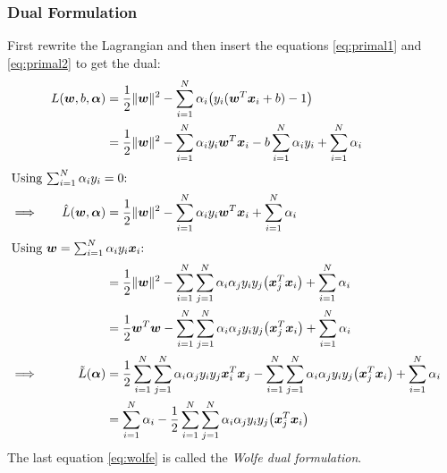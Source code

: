 			\subsubsection{Dual Formulation} %
				First rewrite the Lagrangian and then insert the equations \ref{eq:primal1} and \ref{eq:primal2} to get the dual:
				\begin{align}
					&& L(\vec{w}, b, \vec{\alpha}) &= \frac{1}{2} \lVert \vec{w} \rVert^2 - \sum_{i = 1}^{N} \alpha_i \big( y_i (\vec{w}^T \vec{x}_i + b) - 1 \big) & \\
					&& &= \frac{1}{2} \lVert \vec{w} \rVert^2 - \sum_{i = 1}^{N} \alpha_i y_i \vec{w}^T \vec{x}_i - b \sum_{i = 1}^{N} \alpha_i y_i + \sum_{i = 1}^{N} \alpha_i & \\
					\intertext{Using \( \sum_{i = 1}^{N} \alpha_i y_i = 0 \):}
					\implies && \hat{L}(\vec{w}, \vec{\alpha}) &= \frac{1}{2} \lVert \vec{w} \rVert^2 - \sum_{i = 1}^{N} \alpha_i y_i \vec{w}^T \vec{x}_i + \sum_{i = 1}^{N} \alpha_i & \\
					\intertext{Using \( \vec{w} = \sum_{i = 1}^{N} \alpha_i y_i \vec{x}_i \):}
					&& &= \frac{1}{2} \lVert \vec{w} \rVert^2 - \sum_{i = 1}^{N} \sum_{j = 1}^{N} \alpha_i \alpha_j y_i y_j \big(\vec{x}_j^T \vec{x}_i\big) + \sum_{i = 1}^{N} \alpha_i & \\
					&& &= \frac{1}{2} \vec{w}^T \vec{w} - \sum_{i = 1}^{N} \sum_{j = 1}^{N} \alpha_i \alpha_j y_i y_j \big(\vec{x}_j^T \vec{x}_i\big) + \sum_{i = 1}^{N} \alpha_i & \\
					\implies && \tilde{L}(\vec{\alpha}) &= \frac{1}{2} \sum_{i = 1}^{N} \sum_{j = 1}^{N} \alpha_i \alpha_j y_i y_j \vec{x}_i^T \vec{x}_j - \sum_{i = 1}^{N} \sum_{j = 1}^{N} \alpha_i \alpha_j y_i y_j \big(\vec{x}_j^T \vec{x}_i\big) + \sum_{i = 1}^{N} \alpha_i & \\
					&& &= \sum_{i = 1}^{N} \alpha_i - \frac{1}{2} \sum_{i = 1}^{N} \sum_{j = 1}^{N} \alpha_i \alpha_j y_i y_j \big(\vec{x}_j^T \vec{x}_i\big) & \label{eq:wolfe}
				\end{align}
				The last equation \ref{eq:wolfe} is called the \emph{Wolfe dual formulation}.
				
